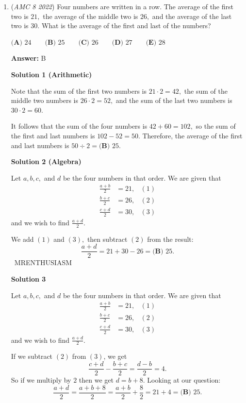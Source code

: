 \begin{enumerate}
 


 


	\item (\textit{AMC 8 2022}) Four numbers are written in a row. The average of the first two is $21,$ the average of the middle two is $26,$ and the average of the last two is $30.$ What is the average of the first and last of the numbers?


 $\textbf{(A) } 24 \qquad \textbf{(B) } 25 \qquad \textbf{(C) } 26 \qquad \textbf{(D) } 27 \qquad \textbf{(E) } 28$

 \textbf{Answer: }B



\textbf{Solution 1 (Arithmetic)}

Note that the sum of the first two numbers is $21\cdot2=42,$ the sum of the middle two numbers is $26\cdot2=52,$ and the sum of the last two numbers is $30\cdot2=60.$

 It follows that the sum of the four numbers is $42+60=102,$ so the sum of the first and last numbers is $102-52=50.$ Therefore, the average of the first and last numbers is $50\div2=\boxed{\textbf{(B) } 25}.$




\textbf{Solution 2 (Algebra)}

Let $a,b,c,$ and $d$ be the four numbers in that order. We are given that
 \begin{align*} \frac{a+b}{2} &= 21, &(1) \\ \frac{b+c}{2} &= 26, &(2) \\ \frac{c+d}{2} &= 30, &(3) \end{align*}
and we wish to find $\frac{a+d}{2}.$

 We add $(1)$ and $(3),$ then subtract $(2)$ from the result: 
 \[\frac{a+d}{2}=21+30-26=\boxed{\textbf{(B) } 25}.\]~MRENTHUSIASM

 



\textbf{Solution 3}

Let $a,b,c,$ and $d$ be the four numbers in that order. We are given that
 \begin{align*} \frac{a+b}{2} &= 21, &(1) \\ \frac{b+c}{2} &= 26, &(2) \\ \frac{c+d}{2} &= 30, &(3) \end{align*}
and we wish to find $\frac{a+d}{2}.$

 If we subtract $(2)$ from $(3)$, we get 
 \[\frac{c+d}{2}-\frac{b+c}{2}=\frac{d-b}{2}=4.\]So if we multiply by $2$ then we get $d=b+8.$ Looking at our question: 
 \[\frac{a+d}{2}=\frac{a+b+8}{2}=\frac{a+b}{2}+\frac{8}{2}=21+4=\boxed{\textbf{(B) } 25}.\]





\end{enumerate}
